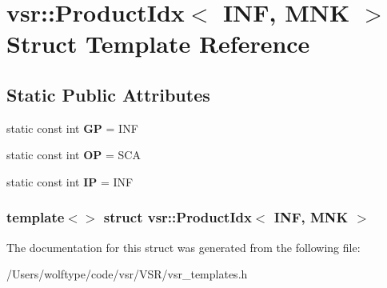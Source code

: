 \hypertarget{structvsr_1_1_product_idx_3_01_i_n_f_00_01_m_n_k_01_4}{\section{vsr\-:\-:Product\-Idx$<$ I\-N\-F, M\-N\-K $>$ Struct Template Reference}
\label{structvsr_1_1_product_idx_3_01_i_n_f_00_01_m_n_k_01_4}
}
\subsection*{Static Public Attributes}
\begin{DoxyCompactItemize}
\item 
\hypertarget{structvsr_1_1_product_idx_3_01_i_n_f_00_01_m_n_k_01_4_a4d3b2177ac3a42dce3e53791ae4bbae2}{static const int {\bfseries G\-P} = I\-N\-F}\label{structvsr_1_1_product_idx_3_01_i_n_f_00_01_m_n_k_01_4_a4d3b2177ac3a42dce3e53791ae4bbae2}

\item 
\hypertarget{structvsr_1_1_product_idx_3_01_i_n_f_00_01_m_n_k_01_4_a0b7e622a049ec23310a6d6c9a1478e53}{static const int {\bfseries O\-P} = S\-C\-A}\label{structvsr_1_1_product_idx_3_01_i_n_f_00_01_m_n_k_01_4_a0b7e622a049ec23310a6d6c9a1478e53}

\item 
\hypertarget{structvsr_1_1_product_idx_3_01_i_n_f_00_01_m_n_k_01_4_a50524c20ef36a2a373dbe9f217a0a2ff}{static const int {\bfseries I\-P} = I\-N\-F}\label{structvsr_1_1_product_idx_3_01_i_n_f_00_01_m_n_k_01_4_a50524c20ef36a2a373dbe9f217a0a2ff}

\end{DoxyCompactItemize}
\subsubsection*{template$<$$>$ struct vsr\-::\-Product\-Idx$<$ I\-N\-F, M\-N\-K $>$}



The documentation for this struct was generated from the following file\-:\begin{DoxyCompactItemize}
\item 
/\-Users/wolftype/code/vsr/\-V\-S\-R/vsr\-\_\-templates.\-h\end{DoxyCompactItemize}
